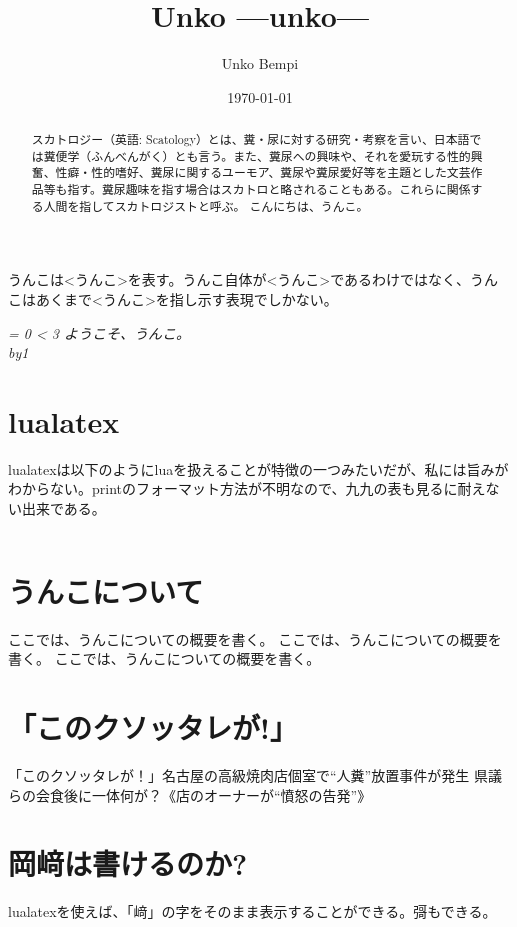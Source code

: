 \documentclass[nomag]{ltjsarticle}
\author{Unko Bempi}
\date{\和暦\today}
\title{Unko ---unko---}
\def\myfor#1{
    \it = 0 \loop\ifnum\it < #1
    ようこそ、うんこ。\\
    \advance\it by1\repeat
}
\begin{document}
\maketitle
\tableofcontents
%
\begin{abstract}
    スカトロジー（英語: Scatology）とは、糞・尿に対する研究・考察を言い、日本語では糞便学（ふんべんがく）とも言う。また、糞尿への興味や、それを愛玩する性的興奮、性癖・性的嗜好、糞尿に関するユーモア、糞尿や糞尿愛好等を主題とした文芸作品等も指す。糞尿趣味を指す場合はスカトロと略されることもある。これらに関係する人間を指してスカトロジストと呼ぶ\cite{wiki}。
    こんにちは、うんこ。
\end{abstract}
%
うんこは<うんこ>を表す。うんこ自体が<うんこ>であるわけではなく、うんこはあくまで<うんこ>を指し示す表現でしかない。
    \myfor{3}
%
\section{lualatex}
\newcommand{\texcmd}{some txtxtxtxtxtxt}
%
lualatexは以下のようにluaを扱えることが特徴の一つみたいだが、私には旨みがわからない。printのフォーマット方法が不明なので、九九の表も見るに耐えない出来である。
%
\begin{center}
    $ $
\end{center}
%
%
\section{うんこについて}
ここでは、うんこについての概要を書く。
ここでは、うんこについての概要を書く。
ここでは、うんこについての概要を書く。

\section{「このクソッタレが!」}
「このクソッタレが！」名古屋の高級焼肉店個室で“人糞”放置事件が発生 県議らの会食後に一体何が？《店のオーナーが“憤怒の告発”》


\section{岡﨑は書けるのか?}
lualatexを使えば、「﨑」の字をそのまま表示することができる。彁\cite{yurei}もできる。
\end{document}
